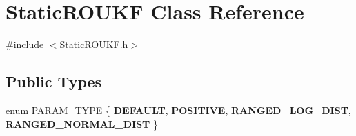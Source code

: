 \hypertarget{classStaticROUKF}{}\section{Static\+R\+O\+U\+KF Class Reference}
\label{classStaticROUKF}


{\ttfamily \#include $<$Static\+R\+O\+U\+K\+F.\+h$>$}

\subsection*{Public Types}
\begin{DoxyCompactItemize}
\item 
enum \mbox{\hyperlink{classStaticROUKF_aa134c047aa5fcdeca7d527666c2903af}{P\+A\+R\+A\+M\+\_\+\+T\+Y\+PE}} \{ {\bfseries D\+E\+F\+A\+U\+LT}, 
{\bfseries P\+O\+S\+I\+T\+I\+VE}, 
{\bfseries R\+A\+N\+G\+E\+D\+\_\+\+L\+O\+G\+\_\+\+D\+I\+ST}, 
{\bfseries R\+A\+N\+G\+E\+D\+\_\+\+N\+O\+R\+M\+A\+L\+\_\+\+D\+I\+ST}
 \}
\end{DoxyCompactItemize}

